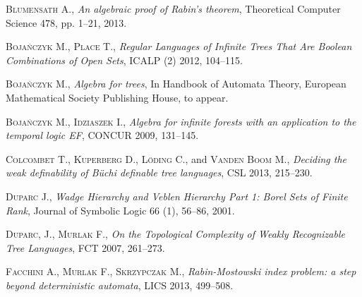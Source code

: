 \begin{thebibliography}{00}

{\footnotesize
{}
\textsc{Blumensath} A., \emph{An algebraic proof of Rabin's theorem}, Theoretical Computer Science \textsc{478}, pp. 1--21, 2013.

\textsc{Boja\'nczyk} M., \textsc{Place} T., \emph{Regular Languages of Infinite Trees That Are Boolean Combinations of Open Sets}, ICALP (2) \textsc{2012}, 104--115.

\textsc{Boja\'nczyk} M., \emph{Algebra for trees}, In Handbook of Automata Theory, European
Mathematical Society Publishing House, to appear.

\textsc{Boja\'nczyk} M., \textsc{Idziaszek} I., \emph{Algebra for infinite forests with an
application to the temporal logic EF}, CONCUR \textsc{2009}, 131--145.


\textsc{Colcombet} T., \textsc{Kuperberg} D., \textsc{Löding} C., and \textsc{Vanden Boom} M., \emph{Deciding the weak definability of Büchi definable tree languages}, CSL \textsc{2013}, 215--230.


\textsc{Duparc} J., \emph{Wadge Hierarchy and Veblen Hierarchy Part 1: Borel Sets of Finite Rank}, Journal of Symbolic Logic \textsc{66} (1), 56--86, 2001.



\textsc{Duparc}, J., \textsc{Murlak} F., \emph{On the Topological Complexity of Weakly Recognizable Tree Languages}, FCT \textsc{2007}, 261--273.

\textsc{Facchini} A., \textsc{Murlak} F., \textsc{Skrzypczak} M.,  \emph{Rabin-Mostowski index problem: a step beyond deterministic automata}, LICS \textsc{2013}, 499--508.


}
\end{thebibliography}
